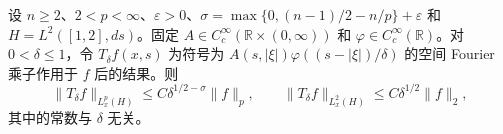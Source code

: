设 $n\ge2$、$2<p<\infty$、$\varepsilon>0$、$\sigma=\max\{0,(n-1)/2-n/p\}+\varepsilon$ 和 $H=L^2([1,2],ds)$。固定 $A\in C_c^\infty(\mathbb R\times(0,\infty))$ 和 $\varphi\in C_c^\infty(\mathbb R)$。对 $0<\delta\le1$，令 $T_\delta f(x,s)$ 为符号为 $A(s,|\xi|)\varphi((s-|\xi|)/\delta)$ 的空间 Fourier 乘子作用于 $f$ 后的结果。则
\[
\|T_\delta f\|_{L_x^p(H)}\le C\delta^{1/2-\sigma}\|f\|_p,
\qquad
\|T_\delta f\|_{L_x^2(H)}\le C\delta^{1/2}\|f\|_2,
\]
其中的常数与 $\delta$ 无关。
